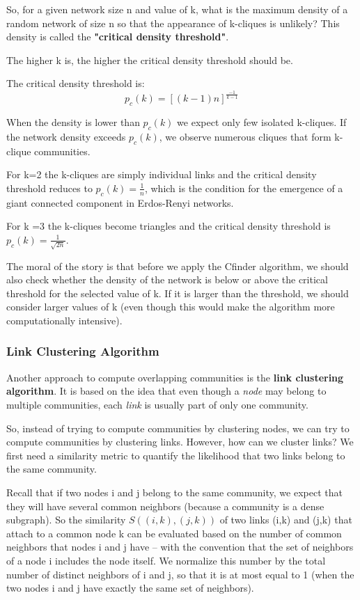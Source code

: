 \documentclass[11pt]{scrartcl} %
\begin{document}
So, for a given network size n and value of k, what is the maximum density of a random network of size n so that the appearance of k-cliques is unlikely? This density is called the \textbf{"critical density threshold"}. 

The higher k is, the higher the critical density threshold should be.

The critical density threshold is:
\[ p_c(k) = \left[ (k-1)n \right] ^{\frac{-1}{k-1}} \]

When the density is lower than $p_c(k)$ we expect only few isolated k-cliques. If the network density exceeds $p_c(k)$, we observe numerous cliques that form k-clique communities.

For k=2 the k-cliques are simply individual links and the critical density threshold reduces to $p_c(k) = \frac{1}{n}$, which is the condition for the emergence of a giant connected component in Erdos-Renyi networks.

For k =3 the k-cliques become triangles and the critical density threshold is $p_c(k) = \frac{1}{\sqrt{2n}}$.

The moral of the story is that before we apply the Cfinder algorithm, we should also check whether the density of the network is below or above the critical threshold for the selected value of k. If it is larger than the threshold, we should consider larger values of k (even though this would make the algorithm more computationally intensive). 

\subsubsection{Link Clustering Algorithm}
Another approach to compute overlapping communities is the \textbf{link clustering algorithm}. It is based on the idea that even though a \emph{node} may belong to multiple communities, each \emph{link} is usually part of only one community.

So, instead of trying to compute communities by clustering nodes, we can try to compute communities by clustering links. However, how can we cluster links? We first need a similarity metric to quantify the likelihood that two links belong to the same community.  

Recall that if two nodes i and j belong to the same community, we expect that they will have several common neighbors (because a community is a dense subgraph). So the similarity $S((i,k),(j,k))$ of two links (i,k) and (j,k)  that attach to a common node k can be evaluated based on the number of common neighbors that nodes i and j have – with the convention that the set of neighbors of a node i includes the node itself.   We normalize this number by the total number of distinct neighbors of i and j, so that it is at most equal to 1 (when the two nodes i and j have exactly the same set of neighbors).
\end{document}
